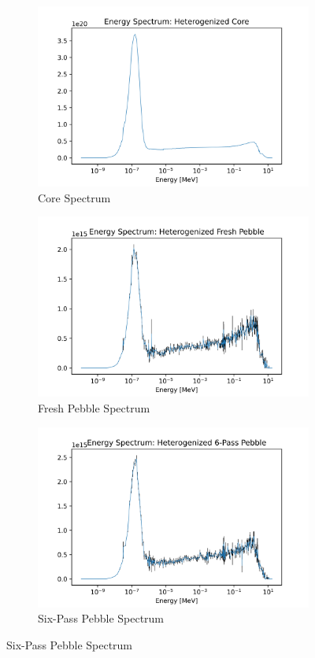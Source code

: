 \begin{figure}[h!]
\centering
%
\begin{subfigure}{0.25\textwidth}
  \includegraphics[width=0.95\linewidth]{figures/core_spec_het}
  \caption{Core Spectrum}
  \label{fig:het-core}
\end{subfigure}%
%
\begin{subfigure}{0.25\textwidth}
  \includegraphics[width=0.95\linewidth]{figures/fresh_spec_het}
  \caption{Fresh Pebble Spectrum}
  \label{fig:het-fresh}
\end{subfigure}%
%
\begin{subfigure}{0.25\textwidth}
  \includegraphics[width=0.95\linewidth]{figures/6_spec_het}
  \caption{Six-Pass Pebble Spectrum}
  \label{fig:het-six}
\end{subfigure}%


\end{figure}
